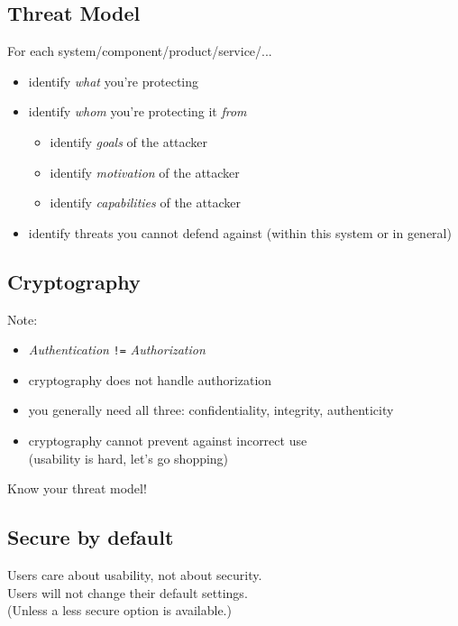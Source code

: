 \documentclass[xga]{xdvislides}
\begin{document}
\subsection{Threat Model}
For each system/component/product/service/...

\begin{itemize}
	\item identify {\em what} you're protecting
	\item identify {\em whom} you're protecting it {\em from}
		\begin{itemize}
			\item identify {\em goals} of the attacker
			\item identify {\em motivation} of the attacker
			\item identify {\em capabilities} of the attacker
		\end{itemize}
	\item identify threats you cannot defend against (within this
		system or in general)
\end{itemize}

\subsection{Cryptography}
Note:
\begin{itemize}
	\item {\em Authentication} \verb+!=+ {\em Authorization}
	\item cryptography does not handle authorization
	\item you generally need all three: confidentiality, integrity, authenticity
	\item cryptography cannot prevent against incorrect use \\
		(usability is hard, let's go shopping)
\end{itemize}
\addvspace{.5in}
Know your threat model!

\subsection{Secure by default}
\vspace{.5in}
\Huge
\begin{center}
Users care about usability, not about security. \\
\addvspace{.5in}
Users will not change their default settings. \\
\Normalsize
(Unless a less secure option is available.)
\end{center}
\end{document}
